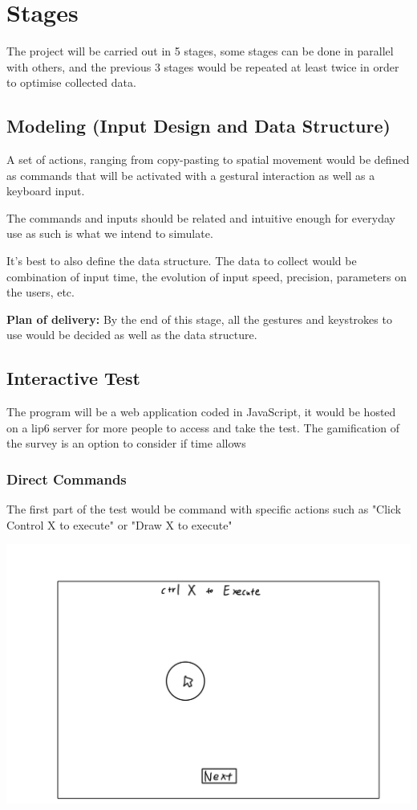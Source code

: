 \documentclass[12pt]{article}
\begin{document}
\section{Stages}

The project will be carried out in 5 stages, some stages can be done in parallel with others, and the previous 3 stages would be repeated at least twice in order to optimise collected data.

\subsection{Modeling (Input Design and Data Structure)}
A set of actions, ranging from copy-pasting to spatial movement would be defined as commands that will be activated with a gestural interaction as well as a keyboard input. 

The commands and inputs should be related and intuitive enough for everyday use as such is what we intend to simulate.

It's best to also define the data structure. The data to collect would be combination of input time, the evolution of input speed, precision, parameters on the users, etc.

\textbf{Plan of delivery: }By the end of this stage, all the gestures and keystrokes to use would be decided as well as the data structure.

\subsection{Interactive Test}
The program will be a web application coded in JavaScript, it would be hosted on a lip6 server for more people to access and take the test. The gamification of the survey is an option to consider if time allows

\subsubsection{Direct Commands}
The first part of the test would be command with specific actions such as "Click Control X to execute" or "Draw X to execute"

\includegraphics[scale=0.15]{click.jpg}
\end{document}
